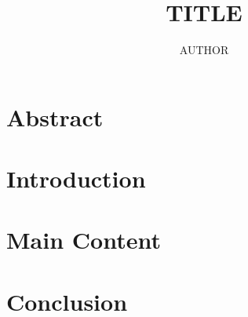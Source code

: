 \documentclass[10pt,twocolumn,letterpaper]{article}
\title{TITLE}
\author{AUTHOR}
\begin{document}
\maketitle

\section*{\centering Abstract}
  \textit{
}
\vspace*{2\baselineskip} %


\section{Introduction}

\section{Main Content}

\section{Conclusion}
\label{sec:conclusion}

\printbibliography
\end{document}
